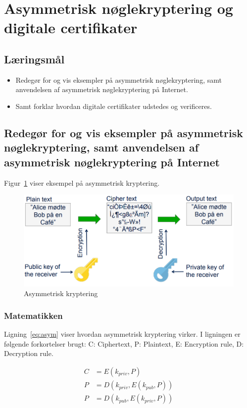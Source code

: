 \section{Asymmetrisk nøglekryptering og digitale certifikater}

\subsection{Læringsmål}

\begin{itemize}
	\item Redegør for og vis eksempler på asymmetrisk nøglekryptering, samt anvendelsen af
	asymmetrisk nøglekryptering på Internet.
	\item Samt forklar hvordan digitale certifikater udstedes og verificeres.
\end{itemize}

\subsection{Redegør for og vis eksempler på asymmetrisk nøglekryptering, samt anvendelsen af asymmetrisk nøglekryptering på Internet}
Figur~\ref{fig:asymmetrickeyenc} viser eksempel på asymmetrisk kryptering.

\begin{figure}[H]
	\centering
	\includegraphics[width=0.7\linewidth]{figs/spm4/asymmetric_key_enc}
	\caption{Asymmetrisk kryptering}
	\label{fig:asymmetrickeyenc}
\end{figure}

\subsubsection{Matematikken}
Ligning~\ref{eq:asym} viser hvordan asymmetrisk kryptering virker. I ligningen er følgende forkortelser brugt: C: Ciphertext, P: Plaintext, E: Encryption rule, D: Decryption rule.

\begin{align}\label{eq:asym}
	C &= E(k_{priv}, P)\\
	P &= D(k_{priv}, E(k_{pub}, P))\\
	P &= D(k_{pub}, E(k_{priv}, P))
\end{align}

